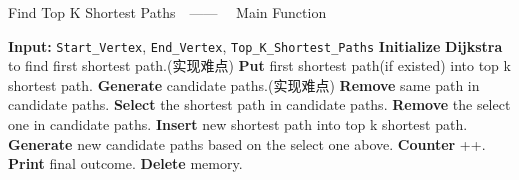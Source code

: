 \begin{algorithm}[htbp]
    \caption{Find Top K Shortest Paths\ \ —— \ \ Main Function}
    \begin{algorithmic}[1]
    \State \textbf{Input:} \texttt{Start\_Vertex}, \texttt{End\_Vertex}, \texttt{Top\_K\_Shortest\_Paths}
    \State \textbf{Initialize}
    \State \textbf{Dijkstra} to find first shortest path.(实现难点)
    \State \textbf{Put} first shortest path(if existed) into top k shortest path.
    \State \textbf{Generate} candidate paths.(实现难点)
        \State \textbf{Remove} same path in candidate paths.
        \State \textbf{Select} the shortest path in candidate paths.
        \State \textbf{Remove} the select one in candidate paths.
            \State \textbf{Insert} new shortest path into top k shortest path.
        \EndIf
        \State \textbf{Generate} new candidate paths based on the select one above.
        \State \textbf{Counter} ++.
    \EndWhile
    \State \textbf{Print} final outcome.
    \State \textbf{Delete} memory.
    \end{algorithmic}
\end{algorithm}
